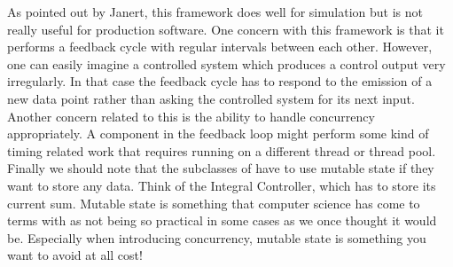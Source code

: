 As pointed out by Janert, this framework does well for simulation but is not really useful for production software. One concern with this framework is that it performs a feedback cycle with regular intervals between each other. However, one can easily imagine a controlled system which produces a control output very irregularly. In that case the feedback cycle has to respond to the emission of a new data point rather than asking the controlled system for its next input. Another concern related to this is the ability to handle concurrency appropriately. A component in the feedback loop might perform some kind of timing related work that requires running on a different thread or thread pool. Finally we should note that the subclasses of  have to use mutable state if they want to store any data. Think of the Integral Controller, which has to store its current sum. Mutable state is something that computer science has come to terms with as not being so practical in some cases as we once thought it would be. Especially when introducing concurrency, mutable state is something you want to avoid at all cost!
